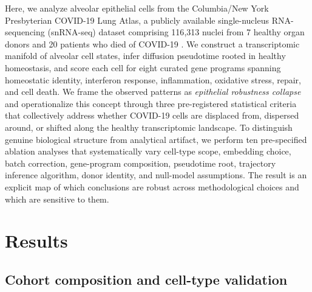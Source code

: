 \documentclass[11pt]{article}
\begin{document}
Here, we analyze alveolar epithelial cells from the Columbia/New York Presbyterian COVID-19 Lung Atlas, a publicly available single-nucleus RNA-sequencing (snRNA-seq) dataset comprising 116{,}313 nuclei from 7 healthy organ donors and 20 patients who died of COVID-19 \citep{Melms2021}. We construct a transcriptomic manifold of alveolar cell states, infer diffusion pseudotime rooted in healthy homeostasis, and score each cell for eight curated gene programs spanning homeostatic identity, interferon response, inflammation, oxidative stress, repair, and cell death. We frame the observed patterns as \emph{epithelial robustness collapse} and operationalize this concept through three pre-registered statistical criteria that collectively address whether COVID-19 cells are displaced from, dispersed around, or shifted along the healthy transcriptomic landscape. To distinguish genuine biological structure from analytical artifact, we perform ten pre-specified ablation analyses that systematically vary cell-type scope, embedding choice, batch correction, gene-program composition, pseudotime root, trajectory inference algorithm, donor identity, and null-model assumptions. The result is an explicit map of which conclusions are robust across methodological choices and which are sensitive to them.

\section{Results}

\subsection{Cohort composition and cell-type validation}
\end{document}
